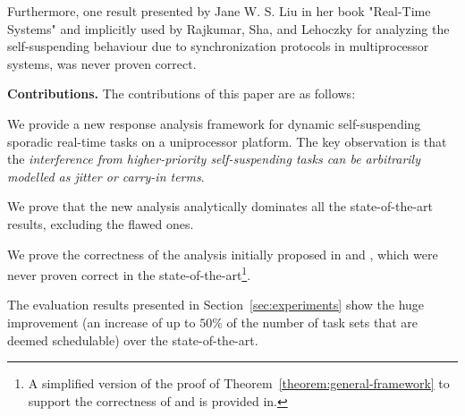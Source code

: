 Furthermore, one result presented by Jane W. S. Liu in her book "Real-Time Systems"
\cite[p. 164-165]{Liu:2000:RS:518501} and implicitly used
by Rajkumar, Sha, and Lehoczky \cite[p.
267]{DBLP:conf/rtss/RajkumarSL88} for analyzing the self-suspending
behaviour due to synchronization protocols in multiprocessor systems, was never proven correct.

\noindent\textbf{Contributions.} The contributions of this paper are
as follows:
\begin{compactitem}
\item We provide a new response analysis framework for dynamic self-suspending
  sporadic real-time tasks on a uniprocessor platform. The
  key observation is that the \emph{interference from higher-priority
    self-suspending tasks can be arbitrarily modelled as jitter or
    carry-in terms}.
\item We prove that the new analysis analytically
  dominates all the state-of-the-art results, excluding the flawed ones.  
\item We prove the
  correctness of the analysis initially proposed in \cite[p.
  164-165]{Liu:2000:RS:518501} and
  \cite[p. 267]{DBLP:conf/rtss/RajkumarSL88}, which were never proven correct in the state-of-the-art\footnote{A simplified
    version of the proof of Theorem~\ref{theorem:general-framework} to support the correctness of \cite[p. 164-165]{Liu:2000:RS:518501} and \cite[p. 267]{DBLP:conf/rtss/RajkumarSL88} is
  provided in\cite{ChenHuangNelissen}.}.
\item The evaluation results presented in Section~\ref{sec:experiments} show the huge improvement (an increase of up to $50\%$ of the number of task sets that are deemed schedulable) over the state-of-the-art.
\end{compactitem}




